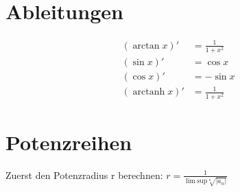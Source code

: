 \documentclass[a4paper,10pt]{article}
\DeclareMathOperator{\arctanh}{arctanh}
\begin{document}
\section{Ableitungen}
\begin{align*}
	(\arctan x)' &= \frac {1}{1 + x^2} \\
	(\sin x)'    &= \cos x \\
	(\cos x)'    &= -\sin x \\
	(\arctanh x)' &= \frac {1}{1 + x^2}
\end{align*}


\section{Potenzreihen}
Zuerst den Potenzradius r berechnen:
\(
	r = \frac {1}{\lim \text{sup} \sqrt[n]{|a_n|}}
\)
\end{document}
